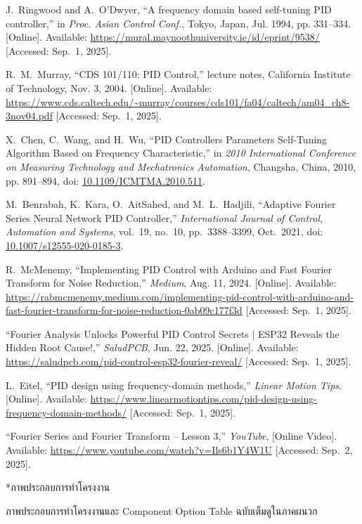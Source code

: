 \documentclass[14pt, fleqn, a4paper]{extarticle}
\makeatletter
\renewcommand\section{%
  \@ifstar{\flatsection}{\@section}%
}
\newcommand{\flatsection}[1]{%
   \par\medskip\noindent
   {\bfseries #1\par}
}
\makeatother
\begin{document}
\begin{enumerate}[label={[{\arabic*}]}]
    \item J.~Ringwood and A.~O’Dwyer, “A frequency domain based self-tuning PID controller,” in \textit{Proc. Asian Control Conf.}, Tokyo, Japan, Jul. 1994, pp. 331–334. [Online]. Available: \url{https://mural.maynoothuniversity.ie/id/eprint/9538/} [Accessed: Sep.~1, 2025].

    \item R.~M.~Murray, “CDS 101/110: PID Control,” lecture notes, California Institute of Technology, Nov. 3, 2004. [Online]. Available: \url{https://www.cds.caltech.edu/~murray/courses/cds101/fa04/caltech/am04_ch8-3nov04.pdf} [Accessed: Sep.~1, 2025].

    \item X.~Chen, C.~Wang, and H.~Wu, “PID Controllers Parameters Self-Tuning Algorithm Based on Frequency Characteristic,” in \textit{2010 International Conference on Measuring Technology and Mechatronics Automation}, Changsha, China, 2010, pp. 891–894, doi: \url{10.1109/ICMTMA.2010.511}.

    \item M.~Benrabah, K.~Kara, O.~AitSahed, and M.~L.~Hadjili, “Adaptive Fourier Series Neural Network PID Controller,” \textit{International Journal of Control, Automation and Systems}, vol.~19, no.~10, pp.~3388–3399, Oct.~2021, doi: \url{10.1007/s12555-020-0185-3}.

    \item R.~McMenemy, “Implementing PID Control with Arduino and Fast Fourier Transform for Noise Reduction,” \textit{Medium}, Aug. 11, 2024. [Online]. Available: \url{https://rabmcmenemy.medium.com/implementing-pid-control-with-arduino-and-fast-fourier-transform-for-noise-reduction-0ab09c177f3d} [Accessed: Sep.~1, 2025].

    \item “Fourier Analysis Unlocks Powerful PID Control Secrets | ESP32 Reveals the Hidden Root Cause!,” \textit{SaludPCB}, Jun. 22, 2025. [Online]. Available: \url{https://saludpcb.com/pid-control-esp32-fourier-reveal/} [Accessed: Sep.~1, 2025].

    \item L.~Eitel, “PID design using frequency-domain methods,” \textit{Linear Motion Tips}. [Online]. Available: \url{https://www.linearmotiontips.com/pid-design-using-frequency-domain-methods/} [Accessed: Sep.~1, 2025].

    \item “Fourier Series and Fourier Transform – Lesson 3,” \textit{YouTube}, [Online Video]. Available: \url{https://www.youtube.com/watch?v=Ils6b1Y4W1U} [Accessed: Sep.~2, 2025].
\end{enumerate}

\section*{ภาพประกอบการทำโครงงาน}

\begin{center}
	ภาพประกอบการทำโครงงานและ Component Option Table ฉบับเต็มดูในภาคผนวก 
\end{center}
\end{document}
